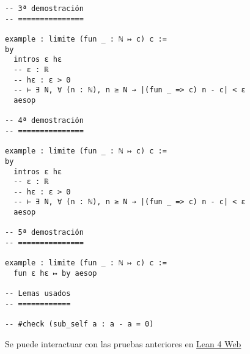 \begin{verbatim}
-- 3ª demostración
-- ===============

example : limite (fun _ : ℕ ↦ c) c :=
by
  intros ε hε
  -- ε : ℝ
  -- hε : ε > 0
  -- ⊢ ∃ N, ∀ (n : ℕ), n ≥ N → |(fun _ => c) n - c| < ε
  aesop

-- 4ª demostración
-- ===============

example : limite (fun _ : ℕ ↦ c) c :=
by
  intros ε hε
  -- ε : ℝ
  -- hε : ε > 0
  -- ⊢ ∃ N, ∀ (n : ℕ), n ≥ N → |(fun _ => c) n - c| < ε
  aesop

-- 5ª demostración
-- ===============

example : limite (fun _ : ℕ ↦ c) c :=
  fun ε hε ↦ by aesop

-- Lemas usados
-- ============

-- #check (sub_self a : a - a = 0)
\end{verbatim}
Se puede interactuar con las pruebas anteriores en \href{https://lean.math.hhu.de/\#url=https://raw.githubusercontent.com/jaalonso/Calculemus2/main/src/Convergencia\_de\_la\_sucesion\_constante.lean}{Lean 4 Web}

